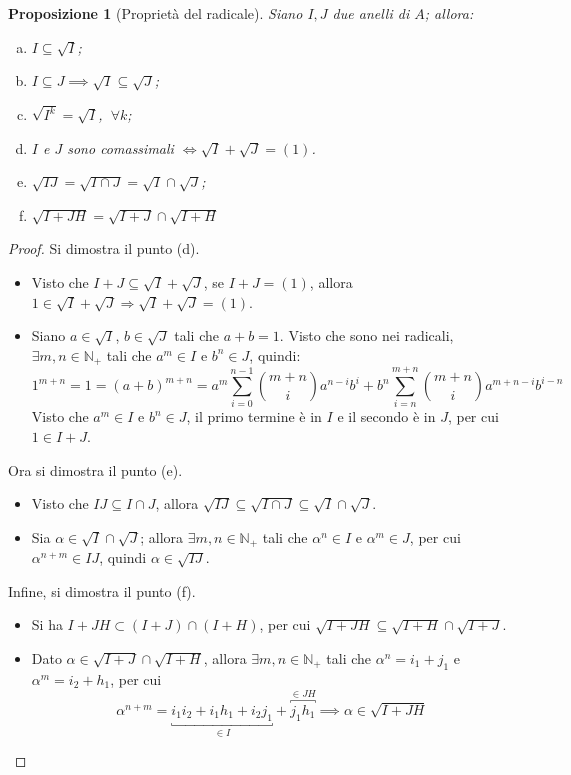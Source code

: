 \documentclass[12pt]{scrartcl}
\theoremstyle{style}
\newtheorem{prop}{Proposizione}[section]
\theoremstyle{style1}
\numberwithin{equation}{subsection}
\begin{document}
\begin{prop}
	[Propriet\`a del radicale]
	Siano $I,J$ due anelli di $A$; allora:
\begin{enumerate}[(a).]
	\item $I \subseteq \sqrt{I} $;
	\item $I \subseteq J \implies \sqrt{I} \subseteq \sqrt{J} $;
	\item $\sqrt{I^k} = \sqrt{I} $, $ \ \forall k$;
	\item $I$ e $J$ sono comassimali $\iff \sqrt{I} +\sqrt{J} =(1)$.
	\item $\sqrt{IJ} = \sqrt{I\cap J} = \sqrt{I} \cap \sqrt{J} $;
	\item $\sqrt{I+JH} = \sqrt{I+J}\cap \sqrt{I+H}  $
\end{enumerate}	
\end{prop}
\begin{proof}
Si dimostra il punto (d).
\begin{itemize}
	\item[$(\Rightarrow)$] Visto che $I+J \subseteq \sqrt{I} +\sqrt{J} $, se $I+J = (1) $, allora $ 1 \in \sqrt{I} +\sqrt{J} \Rightarrow \sqrt{I} +\sqrt{J} = (1)$.
	\item[$(\Leftarrow)$] Siano $a \in \sqrt{I} $, $ b \in \sqrt{J} $ tali che $a+b = 1$. 
		Visto che sono nei radicali, $\exists m,n\in \mathbb{N}_+$ tali che $a^m \in I$ e $b^n \in J$, quindi:
		\[
			1^{m+n} = 1 = (a+b)^{m+n}= a^m \sum_{i=0}^{n-1} \binom{m+n}{i} a^{n-i} b^i + b ^n \sum_{i=n}^{m+n} \binom{m+n}{i} a^{m+n-i} b^{i-n} 
		\] 
		Visto che $a^m \in I$ e $b^n\in J$, il primo termine \`e in $I$ e il secondo \`e in $J$, per cui $1 \in I + J$.
\end{itemize}
Ora si dimostra il punto (e).
\begin{itemize}
	\item[$(\subseteq)$] Visto che $IJ \subseteq I\cap J$, allora $\sqrt{IJ} \subseteq \sqrt{I \cap J} \subseteq \sqrt{I} \cap \sqrt{J} $.
	\item[$(\supseteq)$] Sia $\alpha \in \sqrt{I} \cap \sqrt{J} $; allora $\exists m,n \in \mathbb{N}_+$ tali che $\alpha ^n\in I$ e $\alpha ^{m} \in J$, per cui $\alpha ^{n+m} \in IJ$, quindi $\alpha\in  \sqrt{IJ} $.
\end{itemize}
Infine, si dimostra il punto (f).
\begin{itemize}
	\item[$(\subseteq)$] Si ha $I+JH \subset (I+J)\cap (I+H)$, per cui $\sqrt{I+JH} \subseteq \sqrt{I+H} \cap \sqrt{I+J} $.
	\item[$(\supseteq)$] Dato $\alpha \in \sqrt{I+J} \cap \sqrt{I+H} $, allora $\exists m,n\in \mathbb{N}_+$ tali che $\alpha ^n = i_1 + j_1$ e $\alpha ^m = i_2+h_1$, per cui
		\[
			\alpha ^{n+m} =\underbracket{i_1i_2 + i_1h_1+i_2j_1}_{\in I} +\overbracket{j_1h_1}^{\in JH} \implies \alpha \in \sqrt{I+JH} 
		\] 
		
\end{itemize}
\end{proof}
\end{document}
